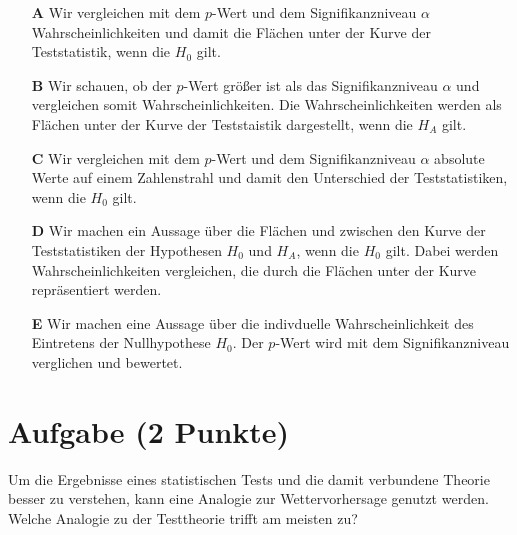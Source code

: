 \documentclass[a4paper, 9pt]{scrartcl}\usepackage[]{graphicx}\usepackage[]{xcolor}
\begin{document}
\begin{enumerate}
\item [\textbf{A} \msquare] Wir vergleichen mit dem $p$-Wert und dem Signifikanzniveau $\alpha$ Wahrscheinlichkeiten und damit die Flächen unter der Kurve der Teststatistik, wenn die $H_0$ gilt.
\item [\textbf{B} \msquare] Wir schauen, ob der $p$-Wert größer ist als das Signifikanzniveau $\alpha$ und vergleichen somit Wahrscheinlichkeiten. Die Wahrscheinlichkeiten werden als Flächen unter der Kurve der Teststaistik dargestellt, wenn die $H_A$ gilt.
\item [\textbf{C} \msquare] Wir vergleichen mit dem $p$-Wert und dem Signifikanzniveau $\alpha$ absolute Werte auf einem Zahlenstrahl und damit den Unterschied der Teststatistiken, wenn die $H_0$ gilt.
\item [\textbf{D} \msquare] Wir machen ein Aussage über die Flächen und zwischen den Kurve der Teststatistiken der Hypothesen $H_0$ und $H_A$, wenn die $H_0$ gilt. Dabei werden Wahrscheinlichkeiten vergleichen, die durch die Flächen unter der Kurve repräsentiert werden.
\item [\textbf{E} \msquare] Wir machen eine Aussage über die indivduelle Wahrscheinlichkeit des Eintretens der Nullhypothese $H_0$. Der $p$-Wert wird mit dem Signifikanzniveau verglichen und bewertet.
\end{enumerate}

\section{Aufgabe \hfill (2 Punkte)}



Um die Ergebnisse eines statistischen Tests und die damit verbundene Theorie besser zu verstehen, kann eine Analogie zur Wettervorhersage genutzt werden. Welche Analogie zu der Testtheorie trifft am meisten zu?
\end{document}
